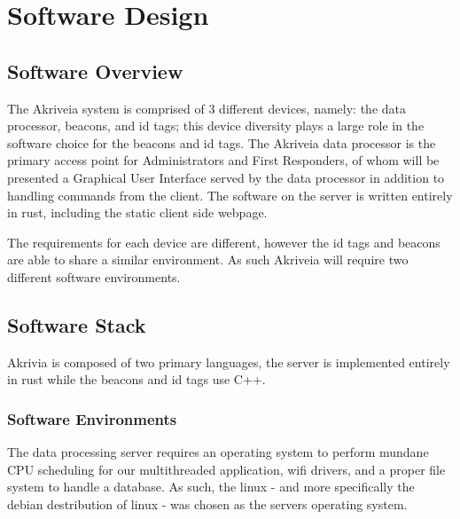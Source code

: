 

\setcounter{section}{5}
\section{Software Design}
\bigskip



\subsection{Software Overview}
The Akriveia system is comprised of 3 different devices, namely: the data processor, beacons, and id tags; this device diversity plays a large role in the software choice for the beacons and id tags.
\smallskip
The Akriveia data processor is the primary access point for Administrators and First Responders, of whom will be presented a Graphical User Interface served by the data processor in addition to handling commands from the client.
The software on the server is written entirely in rust, including the static client side webpage.



\smallskip
The requirements for each device are different, however the id tags and beacons are able to share a similar environment.
As such Akriveia will require two different software environments.

\bigskip
\subsection{Software Stack}
Akrivia is composed of two primary languages, the server is implemented entirely in rust while the beacons and id tags use C++.

\bigskip
\subsubsection{Software Environments}
The data processing server requires an operating system to perform mundane CPU scheduling for our multithreaded application, wifi drivers, and a proper file system to handle a database.
As such, the linux - and more specifically the debian destribution of linux - was chosen as the servers operating system.

